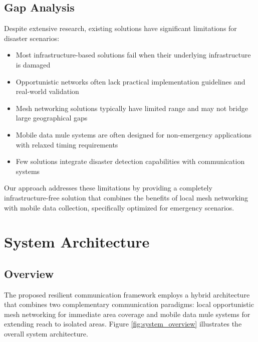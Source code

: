 \documentclass[conference]{IEEEtran}
\begin{document}
\subsection{Gap Analysis}

Despite extensive research, existing solutions have significant limitations for disaster scenarios:

\begin{itemize}
\item Most infrastructure-based solutions fail when their underlying infrastructure is damaged
\item Opportunistic networks often lack practical implementation guidelines and real-world validation
\item Mesh networking solutions typically have limited range and may not bridge large geographical gaps
\item Mobile data mule systems are often designed for non-emergency applications with relaxed timing requirements
\item Few solutions integrate disaster detection capabilities with communication systems
\end{itemize}

Our approach addresses these limitations by providing a completely infrastructure-free solution that combines the benefits of local mesh networking with mobile data collection, specifically optimized for emergency scenarios.

\section{System Architecture}

\subsection{Overview}

The proposed resilient communication framework employs a hybrid architecture that combines two complementary communication paradigms: local opportunistic mesh networking for immediate area coverage and mobile data mule systems for extending reach to isolated areas. Figure \ref{fig:system_overview} illustrates the overall system architecture.
\end{document}
